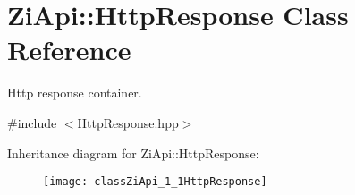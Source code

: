 \hypertarget{classZiApi_1_1HttpResponse}{}\section{Zi\+Api\+::Http\+Response Class Reference}
\label{classZiApi_1_1HttpResponse}


Http response container.  




{\ttfamily \#include $<$Http\+Response.\+hpp$>$}

Inheritance diagram for Zi\+Api\+::Http\+Response\+:\begin{figure}[H]
\begin{center}
\leavevmode
\texttt{[image: classZiApi\_1\_1HttpResponse]}
\end{center}
\end{figure}
